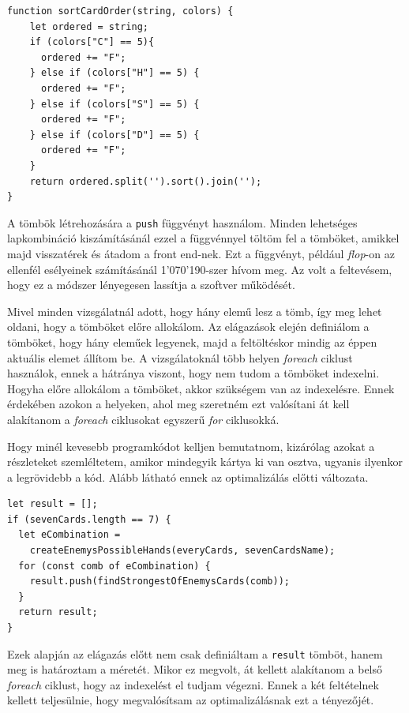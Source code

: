 \begin{lstlisting}[style=htmlcssjs]
function sortCardOrder(string, colors) {
    let ordered = string;
    if (colors["C"] == 5){
      ordered += "F";
    } else if (colors["H"] == 5) {
      ordered += "F";
    } else if (colors["S"] == 5) {
      ordered += "F";
    } else if (colors["D"] == 5) {
      ordered += "F";
    }
    return ordered.split('').sort().join('');
}
\end{lstlisting}


A tömbök létrehozására a \texttt{push} függvényt használom. Minden lehetséges lapkombináció kiszámításánál ezzel a függvénnyel töltöm fel a tömböket, amikkel majd visszatérek és átadom a front end-nek. Ezt a függvényt, például \textit{flop}-on az ellenfél esélyeinek számításánál 1'070'190-szer hívom meg. Az volt a feltevésem, hogy ez a módszer lényegesen lassítja a szoftver működését.

Mivel minden vizsgálatnál adott, hogy hány elemű lesz a tömb, így meg lehet oldani, hogy a tömböket előre allokálom. Az elágazások elején definiálom a tömböket, hogy hány eleműek legyenek, majd a feltöltéskor mindig az éppen aktuális elemet állítom be. A vizsgálatoknál több helyen \textit{foreach} ciklust használok, ennek a hátránya viszont, hogy nem tudom a tömböket indexelni. Hogyha előre allokálom a tömböket, akkor szükségem van az indexelésre. Ennek érdekében azokon a helyeken, ahol meg szeretném ezt valósítani át kell alakítanom a \textit{foreach} ciklusokat egyszerű \textit{for} ciklusokká.

Hogy minél kevesebb programkódot kelljen bemutatnom, kizárólag azokat a részleteket szemléltetem, amikor mindegyik kártya ki van osztva, ugyanis ilyenkor a legrövidebb a kód. Alább látható ennek az optimalizálás előtti változata.
\begin{lstlisting}[style=htmlcssjs]
let result = [];
if (sevenCards.length == 7) {
  let eCombination =
    createEnemysPossibleHands(everyCards, sevenCardsName);
  for (const comb of eCombination) {
    result.push(findStrongestOfEnemysCards(comb));
  }
  return result;
}
\end{lstlisting}
Ezek alapján az elágazás előtt nem csak definiáltam a \texttt{result} tömböt, hanem meg is határoztam a méretét. Mikor ez megvolt, át kellett alakítanom a belső \textit{foreach} ciklust, hogy az indexelést el tudjam végezni. Ennek a két feltételnek kellett teljesülnie, hogy megvalósítsam az optimalizálásnak ezt a tényezőjét.

